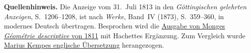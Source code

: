 \par\medskip\begin{small}\noindent\textbf{Quellenhinweis.} Die Anzeige vom 31.~Juli 1813 in den \textit{Göttingischen gelehrten Anzeigen}, S.~1206--1208, ist nach \textit{Werke}, Band~IV (1873), S.~359--360, in modernes Deutsch übertragen. Besprochen wird die \href{https://www.e-rara.ch/zut/content/titleinfo/16072281}{Ausgabe von Monges \textit{Géométrie descriptive} von 1811} mit Hachettes Ergänzung. Zum Vergleich wurde \href{https://mariuskempe.github.io/Writing/Gauss.pdf}{Marius Kempes englische Übersetzung} herangezogen.\par\end{small}
